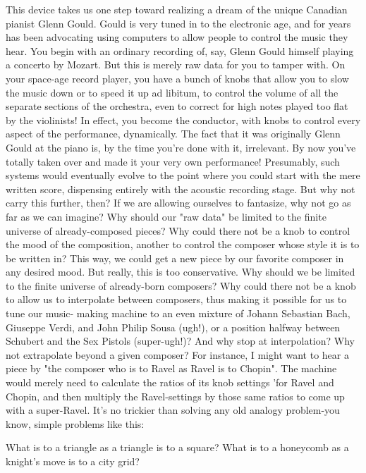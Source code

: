         This device takes us one step toward realizing a dream of the unique Canadian
pianist Glenn Gould. Gould is very tuned in to the electronic age, and for years has
been advocating using computers to allow people to control the music they hear. You
begin with an ordinary recording of, say, Glenn Gould himself playing a concerto by
Mozart. But this is merely raw data for you to tamper with. On your space-age record
player, you have a bunch of knobs that allow you to slow the music down or to speed
it up ad libitum, to control the volume of all the separate sections of the orchestra,
even to correct for high notes played too flat by the violinists! In effect, you become
the conductor, with knobs to control every aspect of the performance, dynamically.
The fact that it was originally Glenn Gould at the piano is, by the time you're done
with it, irrelevant. By now you've totally taken over and made it your very own
performance! Presumably, such systems would eventually evolve to the point where
you could start with the mere written score, dispensing entirely with the acoustic
recording stage.
        But why not carry this further, then? If we are allowing ourselves to fantasize,
why not go as far as we can imagine? Why should our "raw data" be limited to the
finite universe of already-composed pieces? Why could there not be a knob to control
the mood of the composition, another to control the composer whose style it is to be
written in? This way, we could get a new piece by our favorite composer in any
desired mood. But really, this is too conservative. Why should we be limited to the
finite universe of already-born composers? Why could there not be a knob to allow us
to interpolate between composers, thus making it possible for us to tune our music-
making machine to an even mixture of Johann Sebastian Bach, Giuseppe Verdi, and
John Philip Sousa (ugh!), or a position halfway between Schubert and the Sex Pistols
(super-ugh!)? And why stop at interpolation? Why not extrapolate beyond a given
composer? For instance, I might want to hear a piece by "the composer who is to
Ravel as Ravel is to Chopin". The machine would merely need to calculate the ratios
of its knob settings 'for Ravel and Chopin, and then multiply the Ravel-settings by
those same ratios to come up with a super-Ravel.
        It's no trickier than solving any old analogy problem-you know, simple
problems like this:

  What is to a triangle as a triangle is to a square?
  What is to a honeycomb as a knight's move is to a city grid?




